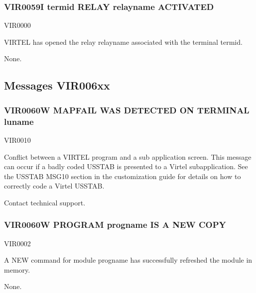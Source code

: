 \documentclass[letterpaper,10pt,english]{sphinxmanual}
\begin{document}
\subsubsection{VIR0059I termid RELAY relayname ACTIVATED}
\label{\detokenize{messages:vir0059i-termid-relay-relayname-activated}}\begin{description}
\sphinxAtStartPar
VIR0000

\sphinxAtStartPar
VIRTEL has opened the relay relayname associated with the terminal termid.

\sphinxAtStartPar
None.

\end{description}


\subsection{Messages VIR006xx}
\label{\detokenize{messages:messages-vir006xx}}

\subsubsection{VIR0060W MAPFAIL WAS DETECTED ON TERMINAL luname}
\label{\detokenize{messages:vir0060w-mapfail-was-detected-on-terminal-luname}}\begin{description}
\sphinxAtStartPar
VIR0010

\sphinxAtStartPar
Conflict between a VIRTEL program and a sub application screen. This message can occur if a badly coded USSTAB is presented to a Virtel sub\sphinxhyphen{}application. See the USSTAB MSG10 section in the customization guide for details on how to correctly code a Virtel USSTAB.

\sphinxAtStartPar
Contact technical support.

\end{description}


\subsubsection{VIR0060W PROGRAM progname IS A NEW COPY}
\label{\detokenize{messages:vir0060w-program-progname-is-a-new-copy}}\begin{description}
\sphinxAtStartPar
VIR0002

\sphinxAtStartPar
A NEW command for module progname has successfully refreshed the module in memory.

\sphinxAtStartPar
None.

\end{description}
\end{document}
